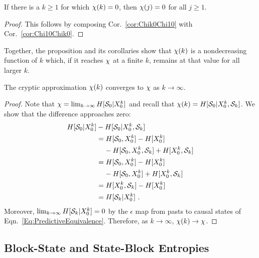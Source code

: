 \begin{Cor}
If there is a $k \geq 1$ for which $\chi(k)=0$, then $\chi(j)=0$ for all
$j \geq 1$.
\label{cor:TrivialChi}
\end{Cor}

\begin{proof}
This follows by composing Cor.~\ref{cor:Chik0Chi10} with Cor.~\ref{cor:Chi10Chik0}.
\end{proof}

Together, the proposition and its corollaries show that $\chi(k)$ is a
nondecreasing function of $k$ which, if it reaches $\chi$ at a finite $k$,
remains at that value for all larger $k$.

\begin{Prop}
The cryptic approximation $\chi(k)$ converges to $\chi$ as $k \to \infty$.
\label{prop:ChiConverges}
\end{Prop}

\begin{proof}
Note that $\chi = \lim_{k \to \infty}{H[\mathcal{S}_0 | {X}_0^k]}$ and
recall that $\chi(k) = H[\mathcal{S}_0 | {X}_0^k, \mathcal{S}_k]$.
We show that the difference approaches zero:
\begin{align*}
H[\mathcal{S}_0 | {X}_0^k]
  & - H[\mathcal{S}_0 | {X}_0^k, \mathcal{S}_k]\\
  & = H[\mathcal{S}_0, {X}_0^k] - H[{X}_0^k] \\
  & \;\;\;\; - H[\mathcal{S}_0, {X}_0^k, \mathcal{S}_k]
	+ H[{X}_0^k, \mathcal{S}_k]\\
  & = H[\mathcal{S}_0, {X}_0^k] - H[{X}_0^k] \\
  & \;\;\;\; - H[\mathcal{S}_0, {X}_0^k]
	+ H[{X}_0^k, \mathcal{S}_k]\\
  & = H[{X}_0^k, \mathcal{S}_k] - H[{X}_0^k]\\
  & = H[\mathcal{S}_k | {X}_0^k] ~.
\end{align*}
Moreover, $\lim_{k \to \infty}{H[\mathcal{S}_k | {X}_0^k]} = 0$ by the
$\epsilon$ map from pasts to causal states of Eqn.~\ref{Eq:PredictiveEquivalence}.
Therefore, as $k \to \infty$, $\chi(k) \to \chi$.
\end{proof}

\subsection{Block-State and State-Block Entropies}

